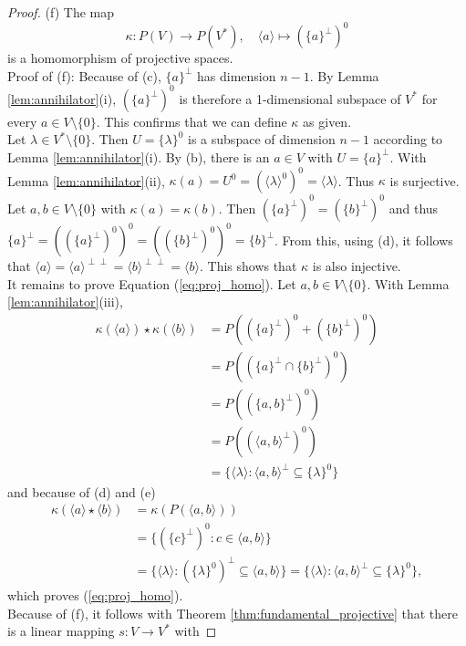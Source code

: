 \documentclass[11pt,a4paper]{article}
\begin{document}
\begin{proof}
(f) The map
\[ \kappa: P(V) \to P(V^*), \quad \langle a \rangle \mapsto (\{a\}^\perp)^0 \]
is a homomorphism of projective spaces. \\
Proof of (f): Because of (c), $\{a\}^\perp$ has dimension $n - 1$. By Lemma \ref{lem:annihilator}(i), $(\{a\}^\perp)^0$ is therefore a 1-dimensional subspace of $V^*$ for every $a \in V \setminus \{0\}$. This confirms that we can define $\kappa$ as given. \\
Let $\lambda \in V^* \setminus \{0\}$. Then $U = \{\lambda\}^0$ is a subspace of dimension $n-1$ according to Lemma \ref{lem:annihilator}(i). By (b), there is an $a \in V$ with $U = \{a\}^\perp$. With Lemma \ref{lem:annihilator}(ii), $\kappa(a) = U^0 = (\langle\lambda\rangle^0)^0 = \langle \lambda \rangle$. Thus $\kappa$ is surjective. \\
Let $a, b \in V \setminus \{0\}$ with $\kappa(a) = \kappa(b)$. Then $(\{a\}^\perp)^0 = (\{b\}^\perp)^0$ and thus $\{a\}^\perp = ((\{a\}^\perp)^0)^0 = ((\{b\}^\perp)^0)^0 = \{b\}^\perp$. From this, using (d), it follows that $\langle a \rangle = \langle a \rangle^{\perp\perp} = \langle b \rangle^{\perp\perp} = \langle b \rangle$. This shows that $\kappa$ is also injective. \\
It remains to prove Equation (\ref{eq:proj_homo}). Let $a, b \in V \setminus \{0\}$. With Lemma \ref{lem:annihilator}(iii),
\begin{align*}
    \kappa(\langle a \rangle) \star \kappa(\langle b \rangle) &= P((\{a\}^\perp)^0 + (\{b\}^\perp)^0) \\
    &= P((\{a\}^\perp \cap \{b\}^\perp)^0) \\
    &= P((\{a, b\}^\perp)^0) \\
    &= P((\langle a, b \rangle^\perp)^0) \\
    &= \{\langle \lambda \rangle : \langle a, b \rangle^\perp \subseteq \{\lambda\}^0 \}
\end{align*}
and because of (d) and (e)
\begin{align*}
    \kappa(\langle a \rangle \star \langle b \rangle) &= \kappa(P(\langle a, b \rangle)) \\
    &= \{(\{c\}^\perp)^0 : c \in \langle a, b \rangle\} \\
    &= \{\langle \lambda \rangle : (\{\lambda\}^0)^\perp \subseteq \langle a, b \rangle\} = \{\langle \lambda \rangle : \langle a, b \rangle^\perp \subseteq \{\lambda\}^0 \},
\end{align*}
which proves (\ref{eq:proj_homo}). \\
Because of (f), it follows with Theorem \ref{thm:fundamental_projective} that there is a linear mapping $s: V \to V^*$ with

\end{proof}
\end{document}
